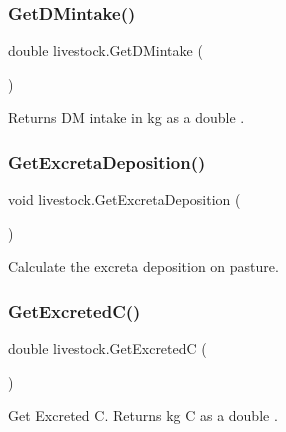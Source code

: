 \subsubsection{\texorpdfstring{GetDMintake()}{GetDMintake()}}
{\footnotesize\ttfamily double livestock.\+Get\+D\+Mintake (\begin{DoxyParamCaption}{ }\end{DoxyParamCaption})\hspace{0.3cm}{\ttfamily [inline]}}



Returns DM intake in kg as a double . 

\mbox{\label{classlivestock_a856d571b94958d5dddf73d7f456f39e2}} 
\subsubsection{\texorpdfstring{GetExcretaDeposition()}{GetExcretaDeposition()}}
{\footnotesize\ttfamily void livestock.\+Get\+Excreta\+Deposition (\begin{DoxyParamCaption}{ }\end{DoxyParamCaption})\hspace{0.3cm}{\ttfamily [inline]}}



Calculate the excreta deposition on pasture. 

\mbox{\label{classlivestock_a1eda214a709c3097f8d471cc965d44fd}} 
\subsubsection{\texorpdfstring{GetExcretedC()}{GetExcretedC()}}
{\footnotesize\ttfamily double livestock.\+Get\+ExcretedC (\begin{DoxyParamCaption}{ }\end{DoxyParamCaption})\hspace{0.3cm}{\ttfamily [inline]}}



Get Excreted C. Returns kg C as a double . 

\mbox{\label{classlivestock_a311826e97a54c6df177b975b78d878f0}} 
